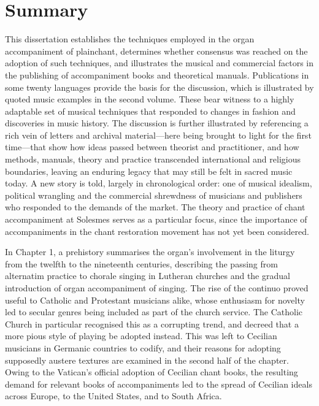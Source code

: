 \chapter*{Summary}
This dissertation establishes the techniques employed in the organ accompaniment of plainchant, determines whether consensus was reached on the adoption of such techniques, and illustrates the musical and commercial factors in the publishing of accompaniment books and theoretical manuals.
Publications in some twenty languages provide the basis for the discussion, which is illustrated by quoted music examples in the second volume.
These bear witness to a highly adaptable set of musical techniques that responded to changes in fashion and discoveries in music history.
The discussion is further illustrated by referencing a rich vein of letters and archival material---here being brought to light for the first time---that show how ideas passed between theorist and practitioner, and how methods, manuals, theory and practice transcended international and religious boundaries, leaving an enduring legacy that may still be felt in sacred music today.
A new story is told, largely in chronological order: one of musical idealism, political wrangling and the commercial shrewdness of musicians and publishers who responded to the demands of the market.
The theory and practice of chant accompaniment at Solesmes serves as a particular focus, since the importance of accompaniments in the chant restoration movement has not yet been considered.

In Chapter 1, a prehistory summarises the organ's involvement in the liturgy from the twelfth to the nineteenth centuries, describing the passing from alternatim practice to chorale singing in Lutheran churches and the gradual introduction of organ accompaniment of singing.
The rise of the continuo proved useful to Catholic and Protestant musicians alike, whose enthusiasm for novelty led to secular genres being included as part of the church service.
The Catholic Church in particular recognised this as a corrupting trend, and decreed that a more pious style of playing be adopted instead.
This was left to Cecilian musicians in Germanic countries to codify, and their reasons for adopting supposedly austere textures are examined in the second half of the chapter.
Owing to the Vatican's official adoption of Cecilian chant books, the resulting demand for relevant books of accompaniments led to the spread of Cecilian ideals across Europe, to the United States, and to South Africa.

